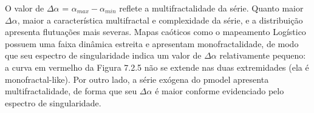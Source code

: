 O valor de $\Delta \alpha$ = $\alpha_{max} - \alpha_{min}$ reflete a multifractalidade da série. Quanto maior $\Delta \alpha$, maior a característica multifractal e complexidade da série, e a distribuição apresenta flutuações mais severas. Mapas caóticos como o mapeamento Logístico possuem uma faixa dinâmica estreita e apresentam monofractalidade, de modo que seu espectro de singularidade indica um valor de $\Delta \alpha$ relativamente pequeno: a curva em vermelho da Figura 7.2.5 não se extende nas duas extremidades (ela é monofractal-like). Por outro lado, a série exógena do pmodel apresenta multifractalidade, de forma que seu $\Delta \alpha$ é maior conforme evidenciado pelo espectro de singularidade.

\begin{figure}[ht!]
	\vspace{0mm}	%
	\begin{center}
	\end{center}
	\vspace{-2mm}	%
	\label{ex6_fig1}
\end{figure}

